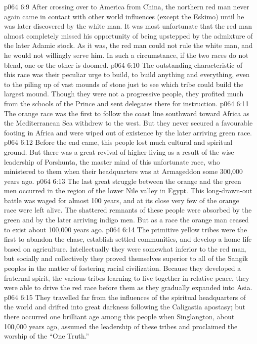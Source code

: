 \vs p064 6:9 After crossing over to America from China, the northern red man never again came in contact with other world influences (except the Eskimo) until he was later discovered by the white man. It was most unfortunate that the red man almost completely missed his opportunity of being upstepped by the admixture of the later Adamic stock. As it was, the red man could not rule the white man, and he would not willingly serve him. In such a circumstance, if the two races do not blend, one or the other is doomed.
\vs p064 6:10 \bibnobreakspace {} The outstanding characteristic of this race was their peculiar urge to build, to build anything and everything, even to the piling up of vast mounds of stone just to see which tribe could build the largest mound. Though they were not a progressive people, they profited much from the schools of the Prince and sent delegates there for instruction.
\vs p064 6:11 The orange race was the first to follow the coast line southward toward Africa as the Mediterranean Sea withdrew to the west. But they never secured a favourable footing in Africa and were wiped out of existence by the later arriving green race.
\vs p064 6:12 Before the end came, this people lost much cultural and spiritual ground. But there was a great revival of higher living as a result of the wise leadership of Porshunta, the master mind of this unfortunate race, who ministered to them when their headquarters was at Armageddon some 300,000 years ago.
\vs p064 6:13 The last great struggle between the orange and the green men occurred in the region of the lower Nile valley in Egypt. This long\hyp{}drawn\hyp{}out battle was waged for almost 100 years, and at its close very few of the orange race were left alive. The shattered remnants of these people were absorbed by the green and by the later arriving indigo men. But as a race the orange man ceased to exist about 100,000 years ago.
\vs p064 6:14 \bibnobreakspace {} The primitive yellow tribes were the first to abandon the chase, establish settled communities, and develop a home life based on agriculture. Intellectually they were somewhat inferior to the red man, but socially and collectively they proved themselves superior to all of the Sangik peoples in the matter of fostering racial civilization. Because they developed a fraternal spirit, the various tribes learning to live together in relative peace, they were able to drive the red race before them as they gradually expanded into Asia.
\vs p064 6:15 They travelled far from the influences of the spiritual headquarters of the world and drifted into great darkness following the Caligastia apostasy; but there occurred one brilliant age among this people when Singlangton, about 100,000 years ago, assumed the leadership of these tribes and proclaimed the worship of the “One Truth.”
